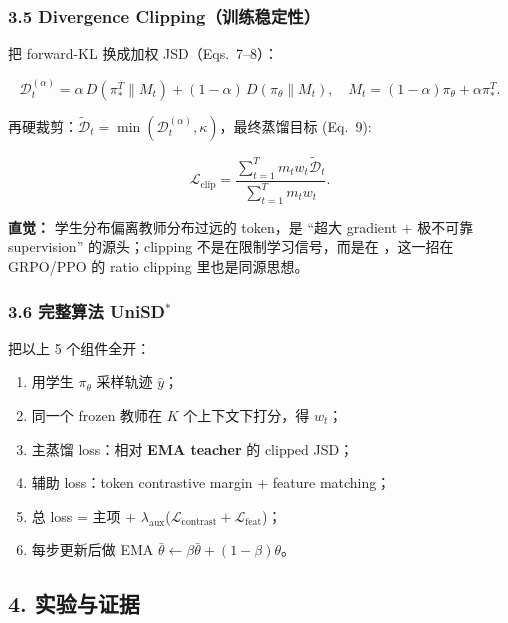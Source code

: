 \subsubsection{3.5 Divergence Clipping（训练稳定性）}

把 forward-KL 换成加权 JSD（Eqs.~7--8）：

\[
\mathcal{D}_t^{(\alpha)} = \alpha\,D(\pi_*^{T}\|M_t)+(1-\alpha)\,D(\pi_\theta\|M_t),
\quad
M_t=(1-\alpha)\pi_\theta+\alpha\pi_*^{T}.
\]

再硬裁剪：$\widetilde{\mathcal{D}}_t = \min(\mathcal{D}_t^{(\alpha)},\kappa)$，最终蒸馏目标 (Eq.~9):

\[
\mathcal{L}_{\text{clip}}
= \frac{\sum_{t=1}^{T}m_t w_t \widetilde{\mathcal{D}}_t}{\sum_{t=1}^{T}m_t w_t}.
\]

\begin{intubox}
\textbf{直觉：} 学生分布偏离教师分布过远的 token，是 ``超大 gradient + 极不可靠 supervision'' 的源头；clipping 不是在限制学习信号，而是在 ，这一招在 GRPO/PPO 的 ratio clipping 里也是同源思想。
\end{intubox}

\subsubsection{\texorpdfstring{3.6 完整算法 UniSD$^{*}$}{3.6 完整算法 UniSD*}}

把以上 5 个组件全开：

\begin{enumerate}[leftmargin=1.5em]
  \item 用学生 $\pi_\theta$ 采样轨迹 $\hat y$；
  \item 同一个 frozen 教师在 $K$ 个上下文下打分，得 $w_t$；
  \item 主蒸馏 loss：相对 \textbf{EMA teacher} 的 clipped JSD；
  \item 辅助 loss：token contrastive margin + feature matching；
  \item 总 loss = 主项 $+$ $\lambda_{\text{aux}}$($\mathcal{L}_{\text{contrast}}+\mathcal{L}_{\text{feat}}$)；
  \item 每步更新后做 EMA $\bar\theta\leftarrow\beta\bar\theta+(1-\beta)\theta$。
\end{enumerate}

\subsection{4. 实验与证据}

